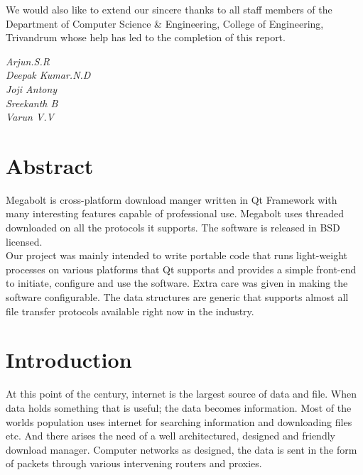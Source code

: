 \documentclass[pdftex,12pt,a4paper,pdfencoding=unicode]{article}
\begin{document}
\begin{onehalfspace}
      \indent We would also like to extend our sincere thanks to all staff members of the Department of Computer Science \& 
      Engineering, College of Engineering, Trivandrum whose help has led to the completion of this report.\\[1cm]
      \begin{minipage}{0.4\textwidth}
        \begin{flushleft}
          {
          }
        \end{flushleft}
      \end{minipage}
      \begin{minipage}{0.4\textwidth}
        \begin{flushright}
          {
            \emph{Arjun.S.R\\Deepak Kumar.N.D\\ Joji Antony\\ Sreekanth B\\ Varun V.V\\}
          }
        \end{flushright}
      \end{minipage}
      \vfill
      \newpage
      
      \section*{\Large Abstract}
      \thispagestyle{plain}
      Megabolt is cross-platform download manger written in Qt Framework with many interesting features
      capable of professional use. Megabolt uses threaded downloaded on all the protocols it supports.
      The software is released in BSD licensed.\\
      
      Our project was mainly intended to write portable code that runs light-weight processes on various
      platforms that Qt supports and provides a simple front-end to initiate, configure and use the software.
      Extra care was given in making the software configurable. The data structures are generic that supports
      almost all file transfer protocols available right now in the industry.
      
      
      \newpage
      \tableofcontents
      \thispagestyle{empty}
      \newpage
      \listoffigures
      \thispagestyle{empty}
      \newpage
      \pagestyle{fancy}
      \fancyhead[R]{\leftmark}
      \fancyhead[L]{\rightmark}
      \fancyfoot[C]{\thepage}
      \section{Introduction}
      \setcounter{page}{1}
      At this point of the century, internet is the largest source of data and file. When data holds something that is useful; the
      data becomes information. Most of the worlds population uses internet for searching information and downloading files etc.
      And there arises the need of a well architectured, designed and friendly download manager. Computer networks as designed,
      the data is sent in the form of packets through various intervening routers and proxies.


\end{onehalfspace}
\end{document}
